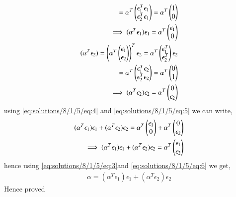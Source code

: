 \begin{enumerate}
\begin{align}
=\alpha^T\begin{pmatrix}\epsilon_1^T\epsilon_1\\\epsilon_2^T\epsilon_1\end{pmatrix} 
=\alpha^T\begin{pmatrix}1\\0\end{pmatrix}\\
\implies(\alpha^T\epsilon_1)\epsilon_1=\alpha^T\begin{pmatrix}\epsilon_1\\0\end{pmatrix} \label{eq:solutions/8/1/5/eq:4}\\
(\alpha^T\epsilon_2)= \left(\alpha^T\begin{pmatrix}\epsilon_1\\\epsilon_2\end{pmatrix}\right)^T\epsilon_2 =\alpha^T\begin{pmatrix}\epsilon_1^T\\\epsilon_2^T\end{pmatrix}\epsilon_2\\
=\alpha^T\begin{pmatrix}\epsilon_1^T\epsilon_2\\\epsilon_2^T\epsilon_2\end{pmatrix} 
=\alpha^T\begin{pmatrix}0\\1\end{pmatrix}\\
\implies(\alpha^T\epsilon_2)\epsilon_2=\alpha^T\begin{pmatrix}0\\\epsilon_2\end{pmatrix} \label{eq:solutions/8/1/5/eq:5}
\end{align}
using \eqref{eq:solutions/8/1/5/eq:4} and \eqref{eq:solutions/8/1/5/eq:5} we can write,
\begin{align}
(\alpha^T\epsilon_1)\epsilon_1 + (\alpha^T\epsilon_2)\epsilon_2 = \alpha^T\begin{pmatrix}\epsilon_1\\0\end{pmatrix} + \alpha^T\begin{pmatrix}0\\\epsilon_2\end{pmatrix}\\
\implies (\alpha^T\epsilon_1)\epsilon_1 + (\alpha^T\epsilon_2)\epsilon_2 = \alpha^T\begin{pmatrix}\epsilon_1\\\epsilon_2\end{pmatrix} \label{eq:solutions/8/1/5/eq:6}
\end{align}
hence using \eqref{eq:solutions/8/1/5/eq:3}and \eqref{eq:solutions/8/1/5/eq:6} we get,
\begin{align}
\alpha = (\alpha^T\epsilon_1)\epsilon_1 + (\alpha^T\epsilon_2)\epsilon_2
\end{align}
Hence proved
\end{enumerate}
